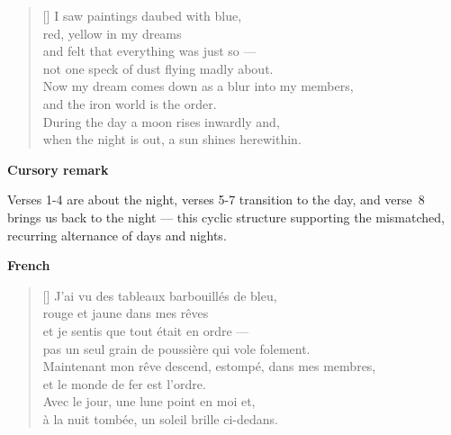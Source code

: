 \documentclass[a4paper,12pt,twoside,final]{book}
\begin{document}
\newpage



\settowidth{\versewidth}{Now my dream comes down as a blur into my members}

\begin{verse}[\versewidth]
  I saw paintings daubed with blue, \\
  red, yellow in my dreams \\
  and felt that everything was just so ---\\
  not one speck of dust flying madly about. \\
  Now my dream comes down as a blur into my members, \\
  and the iron world is the order. \\
  During the day a moon rises inwardly and, \\
  when the night is out, a sun shines herewithin. \\
\end{verse}

\bigskip

\noindent \textbf{Cursory remark}

\medskip

Verses 1-4 are about the night, verses 5-7 transition to the day, and
verse~8 brings us back to the night --- this cyclic structure
supporting the mismatched, recurring alternance of days and
nights.

\bigskip

\noindent \textbf{French}


\settowidth{\versewidth}{Maintenant mon rêve descend, estompé, dans mes membres}

\begin{verse}[\versewidth]
  J'ai vu des tableaux barbouillés de bleu, \\
  rouge et jaune dans mes rêves \\
  et je sentis que tout était en ordre --- \\
  pas un seul grain de poussière qui vole folement. \\
  Maintenant mon rêve descend, estompé, dans mes membres, \\
  et le monde de fer est l'ordre. \\
  Avec le jour, une lune point en moi et, \\
  à la nuit tombée, un soleil brille ci-dedans. \\
\end{verse}
\end{document}
